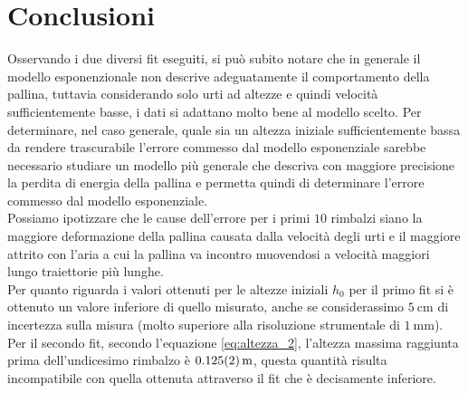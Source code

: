\documentclass[a4paper]{article}
\begin{document}
    \section{Conclusioni}
    Osservando i due diversi fit eseguiti, si può subito notare che in generale il
    modello esponenzionale non descrive adeguatamente il comportamento della pallina,
    tuttavia considerando solo urti ad altezze e quindi velocità sufficientemente basse,
    i dati si adattano molto bene al modello scelto. Per determinare, nel caso generale,
    quale sia un altezza iniziale sufficientemente bassa da rendere trascurabile l'errore
    commesso dal modello esponenziale sarebbe necessario studiare un modello più generale
    che descriva con maggiore precisione la perdita di energia della pallina e permetta
    quindi di determinare l'errore commesso dal modello esponenziale.\\
    Possiamo ipotizzare che le cause dell'errore per i primi $10$ rimbalzi siano la maggiore
    deformazione della pallina causata dalla velocità degli urti e il maggiore attrito
    con l'aria a cui la pallina va incontro muovendosi a velocità maggiori lungo
    traiettorie più lunghe.\\
    Per quanto riguarda i valori ottenuti per le altezze iniziali $h_0$ per il primo fit
    si è ottenuto un valore inferiore di quello misurato, anche se considerassimo
    $\SI{5}{\cm}$ di incertezza sulla misura (molto superiore alla risoluzione strumentale
    di $\SI{1}{\mm}$).
    Per il secondo fit, secondo l'equazione \ref{eq:altezza_2}, l'altezza massima raggiunta prima
    dell'undicesimo rimbalzo è $\SI{0.125\pm 0.002}{\meter}$, questa quantità
    risulta incompatibile con quella ottenuta attraverso il fit che è decisamente inferiore.
\end{document}
